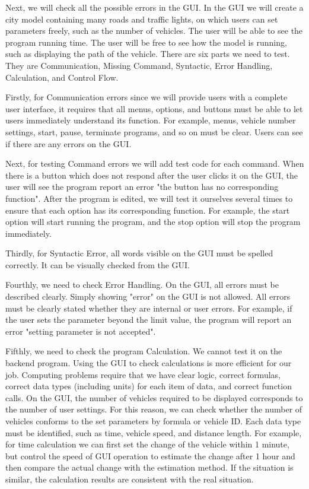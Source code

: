 \documentclass[onecolumn, draftclsnofoot,10pt, compsoc]{IEEEtran}
\begin{document}
Next, we will check all the possible errors in the GUI.
In the GUI we will create a city model containing many roads and traffic lights, on which users can set parameters freely, such as the number of vehicles.
The user will be able to see the program running time.
The user will be free to see how the model is running, such as displaying the path of the vehicle.
There are six parts we need to test.
They are Communication, Missing Command, Syntactic, Error Handling, Calculation, and Control Flow.

Firstly, for Communication errors since we will provide users with a complete user interface, it requires that all menus, options, and buttons must be able to let users immediately understand its function.
For example, menus, vehicle number settings, start, pause, terminate programs, and so on must be clear.
Users can see if there are any errors on the GUI.

Next, for testing Command errors we will add test code for each command.
When there is a button which does not respond after the user clicks it on the GUI, the user will see the program report an error "the button has no corresponding function".
After the program is edited, we will test it ourselves several times to ensure that each option has its corresponding function.
For example, the start option will start running the program, and the stop option will stop the program immediately.

Thirdly, for Syntactic Error, all words visible on the GUI must be spelled correctly.
It can be visually checked from the GUI.

Fourthly, we need to check Error Handling.
On the GUI, all errors must be described clearly.
Simply showing "error" on the GUI is not allowed.
All errors must be clearly stated whether they are internal or user errors.
For example, if the user sets the parameter beyond the limit value, the program will report an error "setting parameter is not accepted".

Fifthly, we need to check the program Calculation.
We cannot test it on the backend program.
Using the GUI to check calculations is more efficient for our job.
Computing problems require that we have clear logic, correct formulas, correct data types (including units) for each item of data, and correct function calls.
On the GUI, the number of vehicles required to be displayed corresponds to the number of user settings.
For this reason, we can check whether the number of vehicles conforms to the set parameters by formula or vehicle ID.
Each data type must be identified, such as time, vehicle speed, and distance length.
For example, for time calculation we can first set the change of the vehicle within 1 minute, but control the speed of GUI operation to estimate the change after 1 hour and then compare the actual change with the estimation method.
If the situation is similar, the calculation results are consistent with the real situation.
\end{document}
